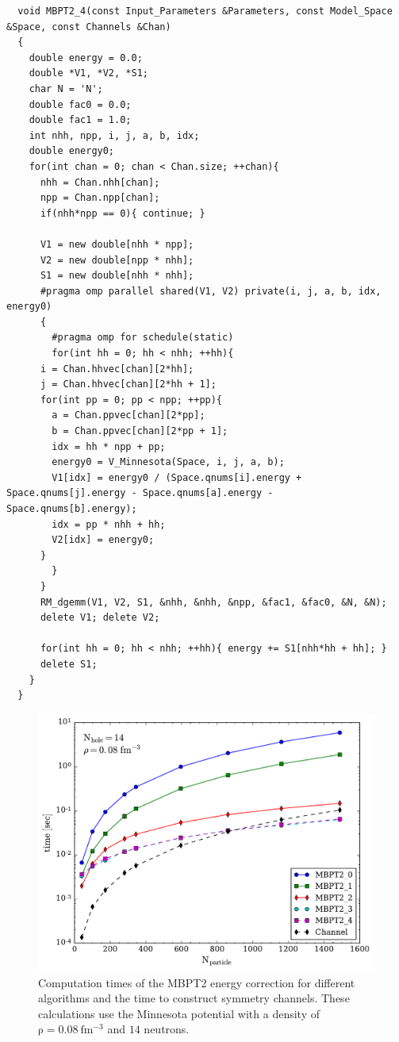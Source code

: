 \begin{lstlisting}
  void MBPT2_4(const Input_Parameters &Parameters, const Model_Space &Space, const Channels &Chan)
  {
    double energy = 0.0;
    double *V1, *V2, *S1;
    char N = 'N';
    double fac0 = 0.0;
    double fac1 = 1.0;
    int nhh, npp, i, j, a, b, idx;
    double energy0;
    for(int chan = 0; chan < Chan.size; ++chan){
      nhh = Chan.nhh[chan];
      npp = Chan.npp[chan];
      if(nhh*npp == 0){ continue; }
      
      V1 = new double[nhh * npp];
      V2 = new double[npp * nhh];
      S1 = new double[nhh * nhh];
      #pragma omp parallel shared(V1, V2) private(i, j, a, b, idx, energy0)
      {
        #pragma omp for schedule(static)
        for(int hh = 0; hh < nhh; ++hh){
	  i = Chan.hhvec[chan][2*hh];
	  j = Chan.hhvec[chan][2*hh + 1];
	  for(int pp = 0; pp < npp; ++pp){
	    a = Chan.ppvec[chan][2*pp];
	    b = Chan.ppvec[chan][2*pp + 1];
	    idx = hh * npp + pp;
	    energy0 = V_Minnesota(Space, i, j, a, b);
	    V1[idx] = energy0 / (Space.qnums[i].energy + Space.qnums[j].energy - Space.qnums[a].energy - Space.qnums[b].energy);
	    idx = pp * nhh + hh;
	    V2[idx] = energy0;
	  }
        }
      } 
      RM_dgemm(V1, V2, S1, &nhh, &nhh, &npp, &fac1, &fac0, &N, &N);
      delete V1; delete V2;
      
      for(int hh = 0; hh < nhh; ++hh){ energy += S1[nhh*hh + hh]; }
      delete S1;
    }
  }
\end{lstlisting}

\begin{figure}
  \includegraphics[width=\linewidth]{Chapter8-figures/MBPT2fig.pdf}
  \caption{Computation times of the MBPT2 energy correction for different algorithms and the time to construct symmetry channels. These calculations use the Minnesota potential with a density of $\mathrm{\rho=0.08\ fm^{-3}}$ and $\mathrm{14}$ neutrons.}
  \label{fig:fig5}
\end{figure}

